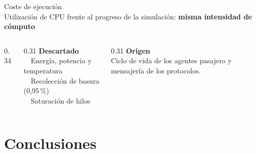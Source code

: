 \documentclass[aspectratio=169]{beamer}
\begin{document}
\begin{frame}[t]{Coste de ejecución}
\vspace{-0.2em}
\centering
{}\\[0.1em]
{\scriptsize\color{black!65}Utilización de CPU frente al progreso de la simulación:
\textbf{misma intensidad de cómputo}}

\vspace{0.6em}
\begin{columns}[T,onlytextwidth]
\begin{column}{0.34\textwidth}
  \centering
\end{column}
\begin{column}{0.31\textwidth}
  {\scriptsize
  \textbf{\color{uc3mblue}Descartado}\\[0.4em]
  \textbullet\ \ Energía, potencia y temperatura\\[0.3em]
  \textbullet\ \ Recolección de basura (0,95\,\%)\\[0.3em]
  \textbullet\ \ Saturación de hilos}
\end{column}
\begin{column}{0.31\textwidth}
  {\scriptsize
  \textbf{\color{uc3mblue}Origen}\\[0.4em]
  Ciclo de vida de los agentes pasajero y mensajería de los protocolos.}
\end{column}
\end{columns}
\end{frame}

\section{Conclusiones}
\begin{frame}\sectionpage\end{frame}
\end{document}
